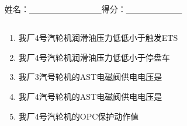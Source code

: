 \documentclass{book}
\begin{document}
		\else						%
		\fi						%
\chapter[2023年07月份技术培训考试]{	\hspace*{-0.3em}}
姓名：\uline{ \ \  \  \ \ \ \ \ \ \ \ \ \ \ \ \ \ }\hfill 得分：\uline{ \ \  \  \ \ \ \ \ \ \ \ \ \ }
\section{}
\begin{enumerate}
\item 我厂4号汽轮机润滑油压力低低小于触发ETS

\item 我厂4号汽轮机润滑油压力低低小于停盘车

\item 我厂3汽号轮机的AST电磁阀供电电压是

\item 我厂4汽号轮机的AST电磁阀供电电压是

\item 我厂4号汽轮机的OPC保护动作值
\end{enumerate}
\end{document}
